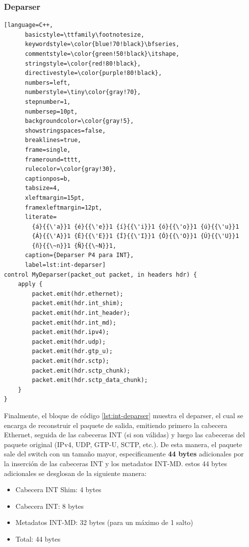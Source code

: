 \subsubsection{Deparser}
  \begin{lstlisting}[language=C++,
      basicstyle=\ttfamily\footnotesize,
      keywordstyle=\color{blue!70!black}\bfseries,
      commentstyle=\color{green!50!black}\itshape,
      stringstyle=\color{red!80!black},
      directivestyle=\color{purple!80!black},
      numbers=left,
      numberstyle=\tiny\color{gray!70},
      stepnumber=1,
      numbersep=10pt,
      backgroundcolor=\color{gray!5},
      showstringspaces=false,
      breaklines=true,
      frame=single,
      frameround=tttt,
      rulecolor=\color{gray!30},
      captionpos=b,
      tabsize=4,
      xleftmargin=15pt,
      framexleftmargin=12pt,
      literate=
        {á}{{\'a}}1 {é}{{\'e}}1 {í}{{\'i}}1 {ó}{{\'o}}1 {ú}{{\'u}}1
        {Á}{{\'A}}1 {É}{{\'E}}1 {Í}{{\'I}}1 {Ó}{{\'O}}1 {Ú}{{\'U}}1
        {ñ}{{\~n}}1 {Ñ}{{\~N}}1,
      caption={Deparser P4 para INT}, 
      label=lst:int-deparser]
control MyDeparser(packet_out packet, in headers hdr) {
    apply {
        packet.emit(hdr.ethernet);
        packet.emit(hdr.int_shim);
        packet.emit(hdr.int_header);
        packet.emit(hdr.int_md);
        packet.emit(hdr.ipv4);
        packet.emit(hdr.udp);
        packet.emit(hdr.gtp_u);
        packet.emit(hdr.sctp);
        packet.emit(hdr.sctp_chunk);
        packet.emit(hdr.sctp_data_chunk);
    }
}
\end{lstlisting}
Finalmente, el bloque de código \ref{lst:int-deparser} muestra el deparser, el cual se encarga de reconstruir el paquete de salida, emitiendo primero la cabecera Ethernet, seguida de las cabeceras INT (si son válidas) y luego las cabeceras del paquete original (IPv4, UDP, GTP-U, SCTP, etc.).
De esta manera, el paquete sale del switch con un tamaño mayor, especificamente \textbf{44 bytes} adicionales por la inserción de las cabeceras INT y los metadatos INT-MD. 
estos 44 bytes adicionales se desglosan de la siguiente manera:
\begin{itemize}
    \item Cabecera INT Shim: 4 bytes
    \item Cabecera INT: 8 bytes
    \item Metadatos INT-MD: 32 bytes (para un máximo de 1 salto)
    \item Total: 44 bytes
\end{itemize} 

